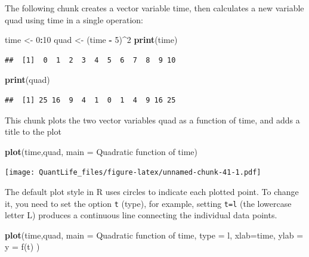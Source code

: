\documentclass[
]{book}
\newenvironment{Shaded}{\begin{snugshade}}{\end{snugshade}}
\newcommand{\DataTypeTok}[1]{\textcolor[rgb]{0.13,0.29,0.53}{#1}}
\newcommand{\DecValTok}[1]{\textcolor[rgb]{0.00,0.00,0.81}{#1}}
\newcommand{\KeywordTok}[1]{\textcolor[rgb]{0.13,0.29,0.53}{\textbf{#1}}}
\newcommand{\NormalTok}[1]{#1}
\newcommand{\OperatorTok}[1]{\textcolor[rgb]{0.81,0.36,0.00}{\textbf{#1}}}
\newcommand{\StringTok}[1]{\textcolor[rgb]{0.31,0.60,0.02}{#1}}
\begin{document}
The following chunk creates a vector variable time, then calculates a new variable quad using time in a single operation:

\begin{Shaded}
\begin{Highlighting}[]
\NormalTok{time \textless{}{-}}\StringTok{ }\DecValTok{0}\OperatorTok{:}\DecValTok{10}
\NormalTok{quad \textless{}{-}}\StringTok{ }\NormalTok{(time }\OperatorTok{{-}}\StringTok{ }\DecValTok{5}\NormalTok{)}\OperatorTok{\^{}}\DecValTok{2}
\KeywordTok{print}\NormalTok{(time)}
\end{Highlighting}
\end{Shaded}

\begin{verbatim}
##  [1]  0  1  2  3  4  5  6  7  8  9 10
\end{verbatim}

\begin{Shaded}
\begin{Highlighting}[]
\KeywordTok{print}\NormalTok{(quad)}
\end{Highlighting}
\end{Shaded}

\begin{verbatim}
##  [1] 25 16  9  4  1  0  1  4  9 16 25
\end{verbatim}

This chunk plots the two vector variables quad as a function of time, and adds a title to the plot

\begin{Shaded}
\begin{Highlighting}[]
\KeywordTok{plot}\NormalTok{(time,quad, }\DataTypeTok{main =} \StringTok{\textquotesingle{}Quadratic function of time\textquotesingle{}}\NormalTok{)}
\end{Highlighting}
\end{Shaded}

\texttt{[image: QuantLife\_files/figure-latex/unnamed-chunk-41-1.pdf]}

The default plot style in R uses circles to indicate each plotted point. To change it, you need to set the option \texttt{t} (type), for example, setting \texttt{t=\textquotesingle{}l\textquotesingle{}} (the lowercase letter L) produces a continuous line connecting the individual data points.

\begin{Shaded}
\begin{Highlighting}[]
\KeywordTok{plot}\NormalTok{(time,quad, }\DataTypeTok{main =} \StringTok{\textquotesingle{}Quadratic function of time\textquotesingle{}}\NormalTok{, }\DataTypeTok{type =} \StringTok{\textquotesingle{}l\textquotesingle{}}\NormalTok{, }\DataTypeTok{xlab=}\StringTok{\textquotesingle{}time\textquotesingle{}}\NormalTok{, }\DataTypeTok{ylab =} \StringTok{\textquotesingle{}y = f(t)\textquotesingle{}}\NormalTok{ )}
\end{Highlighting}
\end{Shaded}
\end{document}
